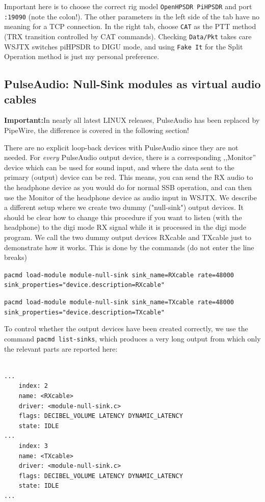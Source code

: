 \documentclass[12pt]{book}
\def\rett#1{\texttt{\color{red}#1}}
\def\pH{pi\-HPSDR\xspace}
\begin{document}
Important here is to choose the correct rig model \rett{OpenHPSDR PiHPSDR} and
port \rett{:19090} (note the colon!). The other parameters in the left side of the tab
have no meaning for a TCP connection. In the right tab, choose \rett{CAT} as
the PTT method (TRX transition controlled by CAT commands). Checking \rett{Data/Pkt}
takes care WSJTX switches \pH to DIGU mode, and using \rett{Fake It} for the Split
Operation method is just my personal preference.

\subsection[PulseAudio: NullSink modules]{PulseAudio: Null-Sink modules as virtual audio cables}

\textbf{Important:}In nearly all latest LINUX releases, PulseAudio has been replaced by
PipeWire, the difference is covered in the following section!

There are no explicit loop-back devices with PulseAudio since they are not needed.
For \textit{every} PulseAudio output device, there is a corresponding ,,Monitor'' device
which can be used for sound input, and where the data sent to the primary (output) device
can be red. This means, you can send the RX audio to the headphone device as you would do
for normal SSB operation, and can then use the Monitor of the headphone device as audio
input in WSJTX. We describe a different setup where we create two dummy
 ("null-sink") output devices. It should be clear how to change this procedure if
 you want to listen (with the headphone) to the digi mode RX signal while it is processed
 in the digi mode program.  We call the two dummy output devices
 RXcable and TXcable just to demonstrate how it works.
  This is done by the commands (do not enter the line breaks)

\texttt{pacmd load-module module-null-sink sink\_name=RXcable rate=48000 \\
sink\_properties="device.description=RXcable"
}

\texttt{pacmd load-module module-null-sink sink\_name=TXcable rate=48000 \\
sink\_properties="device.description=TXcable"
}

To control whether the output devices have been created correctly, we use the command
\texttt{pacmd list-sinks}, which produces
a very long output from which only the relevant parts are reported here:

\begin{small}
\begin{verbatim}

...
    index: 2
	name: <RXcable>
	driver: <module-null-sink.c>
	flags: DECIBEL_VOLUME LATENCY DYNAMIC_LATENCY
	state: IDLE
...
    index: 3
	name: <TXcable>
	driver: <module-null-sink.c>
	flags: DECIBEL_VOLUME LATENCY DYNAMIC_LATENCY
	state: IDLE
...
\end{verbatim}
\end{small}
\end{document}

